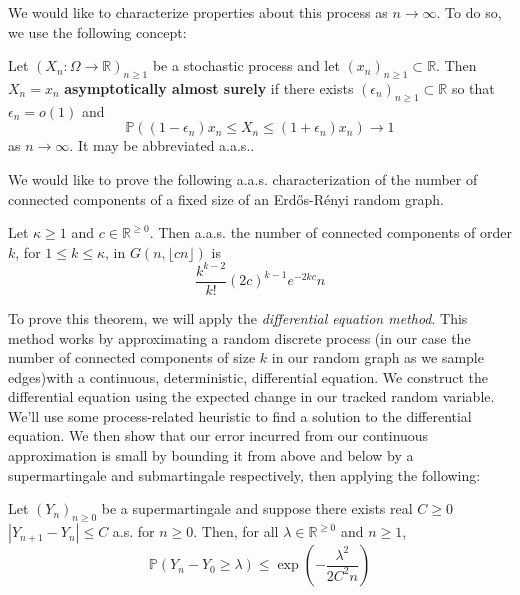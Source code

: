 We would like to characterize properties about this process as \(n \to \infty\). To do so, we use the following concept:
\begin{definition}
     Let \((X_{n}: \Omega \to \mathbb{R})_{n \geq 1}\) be a stochastic process and let \((x_{n})_{n \geq 1}\subset \mathbb{R}\). Then \(X_{n} = x_{n}\) \textbf{asymptotically almost surely} if there exists \((\epsilon_{n})_{n \geq 1} \subset \mathbb{R}\) so that \(\epsilon_{n} = o(1)\) and
    \[\mathbb{P}((1 - \epsilon_{n})x_{n} \leq X_{n} \leq (1 + \epsilon_{n})x_{n}) \to 1\]
    as \(n \to \infty\). It may be abbreviated a.a.s..
\end{definition}

We would like to prove the following a.a.s. characterization of the number of connected components of a fixed size of an Erdős-Rényi random graph.

\begin{theorem}
    Let \(\kappa \geq 1\) and \(c \in \mathbb{R}^{\geq 0}\). Then a.a.s. the number of connected components of order \(k\), for \(1 \leq k \leq \kappa\), in \(G(n, \lfloor cn \rfloor)\) is
    \[\frac{k^{k-2}}{k!}(2c)^{k-1} e^{-2kc}n\]
\end{theorem}

To prove this theorem, we will apply the \textit{differential equation method}. This method works by approximating a random discrete process (in our case the number of connected components of size \(k\) in our random graph as we sample edges)with a continuous, deterministic, differential equation. We construct the differential equation using the expected change in our tracked random variable. We'll use some process-related heuristic to find a solution to the differential equation. We then show that our error incurred from our continuous approximation is small by bounding it from above and below by a supermartingale and submartingale respectively, then applying the following:

\begin{theorem}
    \label{azuma}
    Let \((Y_{n})_{n \geq 0}\) be a supermartingale and suppose there exists real \(C \geq 0\) \(|Y_{n+1} - Y_{n}| \leq C\) a.s. for \(n \geq 0\). Then, for all \(\lambda \in \mathbb{R}^{\geq 0}\) and \(n \geq 1\),
    \[\mathbb{P}(Y_{n} - Y_{0} \geq  \lambda) \leq \exp\left(-\frac{\lambda^{2}}{2C^{2}n}\right)\]
\end{theorem}


